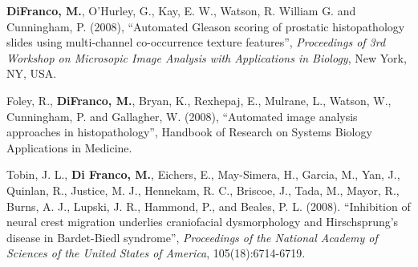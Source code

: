 \documentclass[line,a4paper]{resume}
\begin{document}
\begin{resume}
\begin{minipage}{\textwidth}
	\textbf{DiFranco, M.}, O'Hurley, G., Kay, E. W., Watson, R. William G. and Cunningham, P. (2008), ``Automated Gleason scoring of prostatic histopathology slides using multi-channel co-occurrence texture features'', \emph{Proceedings of 3rd Workshop on Microsopic Image Analysis with Applications in Biology}, New York, NY, USA. \\[2mm]
	\end{minipage}
	\begin{minipage}{\textwidth}
	Foley, R., \textbf{DiFranco, M.}, Bryan, K., Rexhepaj, E., Mulrane, L., Watson, W., Cunningham, P. and Gallagher, W. (2008), ``Automated image analysis approaches in histopathology'', Handbook of Research on Systems Biology Applications in Medicine. \\[2mm]
	\end{minipage}
	\begin{minipage}{\textwidth}
	Tobin, J.  L., \textbf{Di Franco, M.}, Eichers, E., May-Simera, H., Garcia, M., Yan, J., Quinlan, R., Justice, M. J., Hennekam, R. C., Briscoe, J., Tada, M., Mayor, R., Burns, A. J., Lupski, J. R., Hammond, P., and Beales, P. L. (2008).  ``Inhibition of neural crest migration underlies craniofacial dysmorphology and Hirschsprung's disease in Bardet-Biedl syndrome'', \emph{Proceedings of the National Academy of Sciences of the United States of America}, 105(18):6714-6719.
	\end{minipage}

\end{resume}
\end{document}
